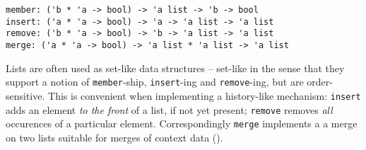 \begin{isabellebody}
\begin{isamarkuptext}
\end{isamarkuptext}%
\isamarkuptrue%
%
\isamarkuptrue%
%
\isamarkuptrue%
%
\begin{isamarkuptext}%
\begin{mldecls}
  \verb|member: ('b * 'a -> bool) -> 'a list -> 'b -> bool| \\
  \verb|insert: ('a * 'a -> bool) -> 'a -> 'a list -> 'a list| \\
  \verb|remove: ('b * 'a -> bool) -> 'b -> 'a list -> 'a list| \\
  \verb|merge: ('a * 'a -> bool) -> 'a list * 'a list -> 'a list| \\
  \end{mldecls}%
\end{isamarkuptext}%
\isamarkuptrue%
%
\begin{isamarkuptext}%
Lists are often used as set-like data structures -- set-like in
  the sense that they support a notion of \verb|member|-ship,
  \verb|insert|-ing and \verb|remove|-ing, but are order-sensitive.
  This is convenient when implementing a history-like mechanism:
  \verb|insert| adds an element \emph{to the front} of a list,
  if not yet present; \verb|remove| removes \emph{all} occurences
  of a particular element.  Correspondingly \verb|merge| implements a 
  a merge on two lists suitable for merges of context data
  ().


\end{isamarkuptext}
\end{isabellebody}

